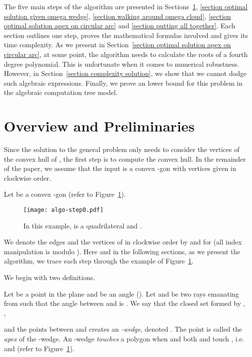 \documentclass[11pt, oneside]{article}
\begin{document}
The five main steps of the algorithm
are presented in Sections~\ref{section overview preliminaries}, 
\ref{section optimal solution given omega wedge}, 
\ref{section walking around omega cloud},
\ref{section optimal solution apex on circular arc}
and \ref{section putting all together}.
Each section outlines one step,
proves the mathematical formulas involved
and gives its time complexity.
As we present in Section~\ref{section optimal solution apex on circular arc},
at some point,
the algorithm needs to calculate the roots of a fourth degree polynomial.
This is unfortunate when it comes to numerical robustness.
However,
in Section~\ref{section complexity solution},
we show that we cannot dodge
such algebraic expressions.
Finally,
we prove an  lower bound for this problem
in the algebraic computation tree model.



\section{Overview and Preliminaries}
\label{section overview preliminaries}






Since the solution to the general problem 
only needs to consider the vertices
of the convex hull of , 
the first step is to compute the convex hull.
In the remainder of the paper,
we assume that the input is a convex -gon
with vertices given in clockwise order. 

Let  be a convex -gon
(refer to Figure~\ref{figure algo-step0}).
\begin{figure}
\centering
\texttt{[image: algo-step0.pdf]}
\caption{In this example,
 is a quadrilateral
and .\label{figure algo-step0}}
\end{figure}
We denote the edges and the vertices of 
in clockwise order 
by  and  for 
(all index manipulation is modulo ).
Here and in the following sections,
as we present the algorithm,
we trace each step through the example of Figure~\ref{figure algo-step0}.

We begin with two definitions.
\begin{definition}[-wedge]
Let  be a point in the plane
and  be an angle 
().
Let  and  be two rays emanating from 
such that the angle between  and  is .
We say that the closed set formed by , 
, 
 
and the points between  and 
creates an \emph{-wedge},
denoted .
The point  is called the \emph{apex} of the -wedge.
An -wedge  \emph{touches} a polygon 
when  and both
 and  touch ,
i.e. 
and 
(refer to Figure~\ref{figure algo-step0}).
\end{definition}
\end{document}
